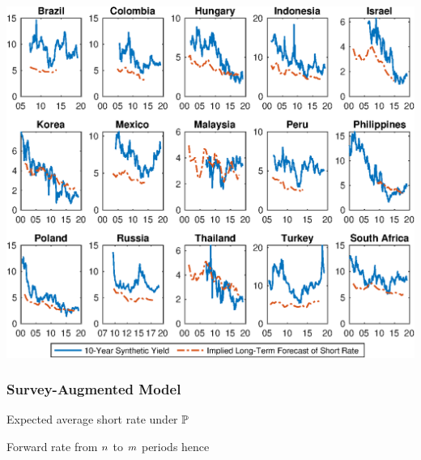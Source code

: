 \documentclass[12pt, aspectratio=169, xcolor=dvipsnames]{beamer}
\begin{document}
\begin{frame}[label=yldcbp]
\begin{center}							%
	\includegraphics[trim={0cm 0cm 0cm 0cm},clip,height=0.95\textheight,width=\linewidth]{../Figures/Data/YLD10Y_CBP.eps} \\
\end{center}
\end{frame}


\begin{frame}[label=SvyAugModel]
\frametitle{Survey-Augmented Model}

Expected average short rate under \(\mathbb{P}\)


Forward rate from \(n\) to \(m\) periods hence


\end{frame}
\end{document}

